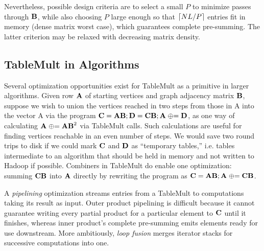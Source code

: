 Nevertheless, possible design criteria are to select a small $P$ to minimize passes through $\mathbf{B}$,
while also choosing $P$ large enough so that $\lceil NL/P\rceil$ entries fit in memory
(dense matrix worst case), which guarantees complete pre-summing.
The latter criterion may be relaxed with decreasing matrix density.


\subsection{TableMult in Algorithms}

Several optimization opportunities exist for TableMult as a primitive in larger algorithms.
Given row $\mathbf{A}$ of starting vertices and graph adjacency matrix $\mathbf{B}$, 
suppose we wish to union the vertices reached in two steps from those in A into the vector A via the program
 $\mathbf{C} = \mathbf{AB}; \mathbf{D} = \mathbf{CB}; \mathbf{A} \mathrel{\oplus}= \mathbf{D}$,
as one way of calculating $\mathbf{A} \mathrel{\oplus}= \mathbf{AB}^2$ via TableMult calls.
Such calculations are useful for finding vertices reachable in an even number of steps.
We would save two round trips to disk if we could mark $\mathbf{C}$ and $\mathbf{D}$ as 
``temporary tables,'' i.e. tables intermediate to an algorithm that should be held in memory 
and not written to Hadoop if possible.
Combiners in TableMult do enable one optimization:
summing $\mathbf{CB}$ into $\mathbf{A}$ directly by rewriting the program as 
$\mathbf{C} = \mathbf{AB}; \mathbf{A} \mathrel{\oplus}= \mathbf{CB}$.

A \emph{pipelining} optimization streams entries from a TableMult 
to computations taking its result as input. 
Outer product pipelining is difficult
because it cannot guarantee writing every partial product for a particular element 
 to $\mathbf{C}$ until it finishes,
whereas inner product's complete pre-summing emits elements ready for use downstream.
More ambitiously, \emph{loop fusion} merges iterator stacks 
for successive computations into one. 

